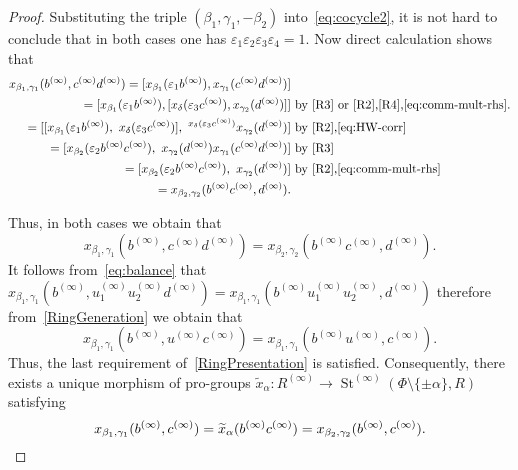 \documentclass{article}
\numberwithin{equation}{section}
\theoremstyle{definition}
\theoremstyle{remark}
\DeclareMathOperator\St{St}
\begin{document}
\begin{proof}
 Substituting the triple $(\beta_1, \gamma_1, -\beta_2)$ into~\eqref{eq:cocycle2}, it is not hard to conclude that in both cases one has $\varepsilon_1 \varepsilon_2 \varepsilon_3 \varepsilon_4 = 1$. Now direct calculation shows that
 \begin{align*}
x_{\beta_1, \gamma_1}(b^{(\infty)}, c^{(\infty)} d^{(\infty)}) = [x_{\beta_1}(\varepsilon_1b^{(\infty)}), x_{\gamma_1}(c^{(\infty)} d^{(\infty)})] & \nonumber \\
= [x_{\beta_1}(\varepsilon_1b^{(\infty)}), [x_{\delta}(\varepsilon_3c^{(\infty)}), x_{\gamma_2}(d^{(\infty)})]] &\text{  by~\eqref{R3} or~\eqref{R2},\eqref{R4},\eqref{eq:comm-mult-rhs}.} \nonumber \\ 
= [[x_{\beta_1}(\varepsilon_1b^{(\infty)}),\ x_\delta(\varepsilon_3c^{(\infty)})],\ {}^{x_\delta(\varepsilon_3c^{(\infty)})}x_{\gamma_2}(d^{(\infty)})] & \text{ by~\eqref{R2},\eqref{eq:HW-corr}}\\
= [x_{\beta_2}(\varepsilon_2b^{(\infty)}c^{(\infty)}),\ x_{\gamma_2}(d^{(\infty)}) x_{\gamma_1}(c^{(\infty)}d^{(\infty)}) ] & \text{ by~\eqref{R3}}\\
= [x_{\beta_2}(\varepsilon_2b^{(\infty)}c^{(\infty)}),\ x_{\gamma_2}(d^{(\infty)})] &\text{ by~\eqref{R2},\eqref{eq:comm-mult-rhs}} \\
= x_{\beta_2, \gamma_2}(b^{(\infty)} c^{(\infty)}, d^{(\infty)}). & \end{align*}

 Thus, in both cases we obtain that
 \begin{equation}\label{eq:balance}
 x_{\beta_1, \gamma_1}(b^{(\infty)}, c^{(\infty)} d^{(\infty)}) = x_{\beta_2, \gamma_2}(b^{(\infty)} c^{(\infty)}, d^{(\infty)}).
 \end{equation}
 It follows from~\eqref{eq:balance} that $x_{\beta_1,\gamma_1}(b^{(\infty)}, u_1^{(\infty)}u_2^{(\infty)}d^{(\infty)}) = x_{\beta_1,\gamma_1}(b^{(\infty)}u_1^{(\infty)}u_2^{(\infty)},d^{(\infty)})$ therefore from~\cref{RingGeneration} we obtain that
 \[x_{\beta_1, \gamma_1}(b^{(\infty)}, u^{(\infty)} c^{(\infty)}) = x_{\beta_1, \gamma_1}(b^{(\infty)} u^{(\infty)}, c^{(\infty)}).\]
 Thus, the last requirement of~\cref{RingPresentation} is satisfied. Consequently, there exists a unique morphism of pro-groups \(\widetilde x_\alpha \colon R^{(\infty)} \to \St^{(\infty)}(\Phi \setminus \{\pm \alpha\}, R)\) satisfying
 \[x_{\beta_1, \gamma_1}(b^{(\infty)}, c^{(\infty)}) = \widetilde x_\alpha(b^{(\infty)} c^{(\infty)}) = x_{\beta_2, \gamma_2}(b^{(\infty)}, c^{(\infty)}). \qedhere\]
\end{proof}
\end{document}
